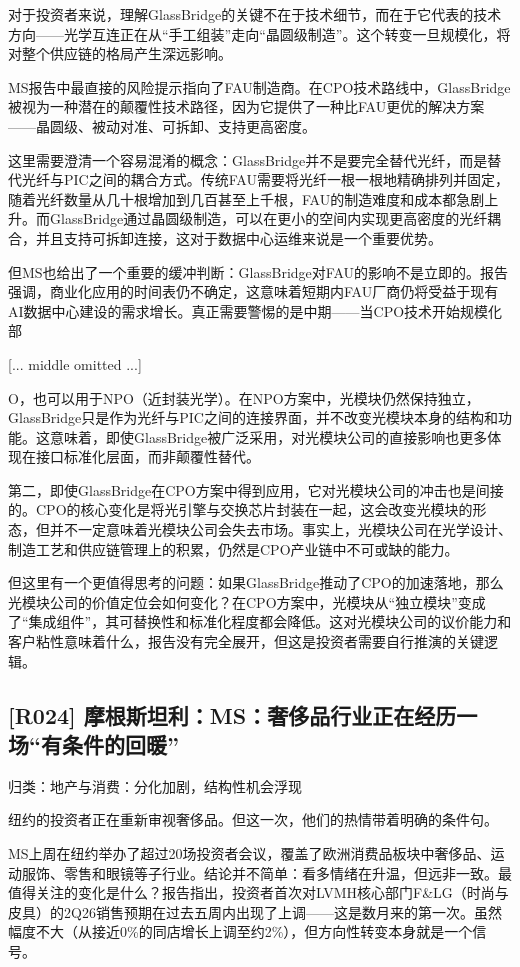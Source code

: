 \documentclass[11pt]{ctexart}
\begin{document}
对于投资者来说，理解GlassBridge的关键不在于技术细节，而在于它代表的技术方向——光学互连正在从“手工组装”走向“晶圆级制造”。这个转变一旦规模化，将对整个供应链的格局产生深远影响。

MS报告中最直接的风险提示指向了FAU制造商。在CPO技术路线中，GlassBridge被视为一种潜在的颠覆性技术路径，因为它提供了一种比FAU更优的解决方案——晶圆级、被动对准、可拆卸、支持更高密度。

这里需要澄清一个容易混淆的概念：GlassBridge并不是要完全替代光纤，而是替代光纤与PIC之间的耦合方式。传统FAU需要将光纤一根一根地精确排列并固定，随着光纤数量从几十根增加到几百甚至上千根，FAU的制造难度和成本都急剧上升。而GlassBridge通过晶圆级制造，可以在更小的空间内实现更高密度的光纤耦合，并且支持可拆卸连接，这对于数据中心运维来说是一个重要优势。

但MS也给出了一个重要的缓冲判断：GlassBridge对FAU的影响不是立即的。报告强调，商业化应用的时间表仍不确定，这意味着短期内FAU厂商仍将受益于现有AI数据中心建设的需求增长。真正需要警惕的是中期——当CPO技术开始规模化部

[... middle omitted ...]

O，也可以用于NPO（近封装光学）。在NPO方案中，光模块仍然保持独立，GlassBridge只是作为光纤与PIC之间的连接界面，并不改变光模块本身的结构和功能。这意味着，即使GlassBridge被广泛采用，对光模块公司的直接影响也更多体现在接口标准化层面，而非颠覆性替代。

第二，即使GlassBridge在CPO方案中得到应用，它对光模块公司的冲击也是间接的。CPO的核心变化是将光引擎与交换芯片封装在一起，这会改变光模块的形态，但并不一定意味着光模块公司会失去市场。事实上，光模块公司在光学设计、制造工艺和供应链管理上的积累，仍然是CPO产业链中不可或缺的能力。

但这里有一个更值得思考的问题：如果GlassBridge推动了CPO的加速落地，那么光模块公司的价值定位会如何变化？在CPO方案中，光模块从“独立模块”变成了“集成组件”，其可替换性和标准化程度都会降低。这对光模块公司的议价能力和客户粘性意味着什么，报告没有完全展开，但这是投资者需要自行推演的关键逻辑。

\subsection{[R024] 摩根斯坦利：MS：奢侈品行业正在经历一场“有条件的回暖”}
{\small\color{refgray}归类：地产与消费：分化加剧，结构性机会浮现}

纽约的投资者正在重新审视奢侈品。但这一次，他们的热情带着明确的条件句。

MS上周在纽约举办了超过20场投资者会议，覆盖了欧洲消费品板块中奢侈品、运动服饰、零售和眼镜等子行业。结论并不简单：看多情绪在升温，但远非一致。最值得关注的变化是什么？报告指出，投资者首次对LVMH核心部门F\&LG（时尚与皮具）的2Q26销售预期在过去五周内出现了上调——这是数月来的第一次。虽然幅度不大（从接近0\%的同店增长上调至约2\%），但方向性转变本身就是一个信号。
\end{document}
